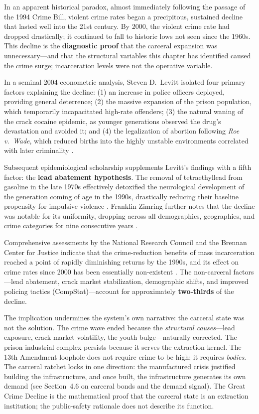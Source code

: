 In an apparent historical paradox, almost immediately following the passage of the 1994 Crime Bill, violent crime rates began a precipitous, sustained decline that lasted well into the 21st century. By 2000, the violent crime rate had dropped drastically; it continued to fall to historic lows not seen since the 1960s. This decline is the \textbf{diagnostic proof} that the carceral expansion was unnecessary---and that the structural variables this chapter has identified caused the crime surge; incarceration levels were not the operative variable.

In a seminal 2004 econometric analysis, Steven D.\ Levitt isolated four primary factors explaining the decline: (1) an increase in police officers deployed, providing general deterrence; (2) the massive expansion of the prison population, which temporarily incapacitated high-rate offenders; (3) the natural waning of the crack cocaine epidemic, as younger generations observed the drug's devastation and avoided it; and (4) the legalization of abortion following \textit{Roe v.\ Wade}, which reduced births into the highly unstable environments correlated with later criminality \cite{levitt2004}.

Subsequent epidemiological scholarship supplements Levitt's findings with a fifth factor: the \textbf{lead abatement hypothesis}. The removal of tetraethyllead from gasoline in the late 1970s effectively detoxified the neurological development of the generation coming of age in the 1990s, drastically reducing their baseline propensity for impulsive violence \cite{nevin2007, reyes2007}. Franklin Zimring further notes that the decline was notable for its uniformity, dropping across all demographics, geographies, and crime categories for nine consecutive years \cite{zimring}.

Comprehensive assessments by the National Research Council and the Brennan Center for Justice indicate that the crime-reduction benefits of mass incarceration reached a point of rapidly diminishing returns by the 1990s, and its effect on crime rates since 2000 has been essentially non-existent \cite{brennan_decline}. The non-carceral factors---lead abatement, crack market stabilization, demographic shifts, and improved policing tactics (CompStat)---account for approximately \textbf{two-thirds} of the decline.

The implication undermines the system's own narrative: the carceral state was not the solution. The crime wave ended because the \textit{structural causes}---lead exposure, crack market volatility, the youth bulge---naturally corrected. The prison-industrial complex persists because it serves the extraction kernel. The 13th Amendment loophole does not require crime to be high; it requires \textit{bodies}. The carceral ratchet locks in one direction: the manufactured crisis justified building the infrastructure, and once built, the infrastructure generates its own demand (see Section~4.6 on carceral bonds and the demand signal). The Great Crime Decline is the mathematical proof that the carceral state is an extraction institution; the public-safety rationale does not describe its function.

